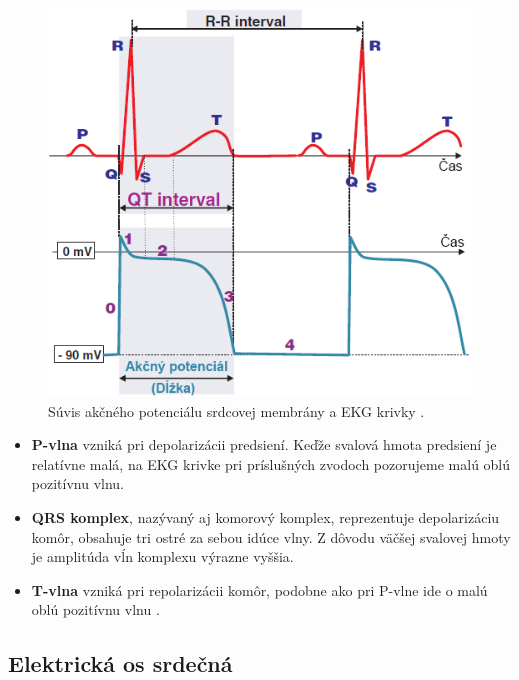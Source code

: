 \begin{figure}[H]
    \centering
    \includegraphics[scale=0.45]{img/action-potential-duration.png}
    \caption{Súvis akčného potenciálu srdcovej membrány a EKG krivky \cite{Blahút_2017}.}
    \label{fig:action_potential_duration}
\end{figure}

\begin{itemize}
    \item \textbf{P-vlna} vzniká pri depolarizácii predsiení. Keďže svalová hmota predsiení je relatívne malá, na EKG krivke pri príslušných zvodoch pozorujeme malú oblú pozitívnu vlnu.
    \item \textbf{QRS komplex}, nazývaný aj komorový komplex, reprezentuje depolarizáciu komôr, obsahuje tri ostré za sebou idúce vlny. Z dôvodu väčšej svalovej hmoty je amplitúda vĺn komplexu výrazne vyššia. 
    \item \textbf{T-vlna} vzniká pri repolarizácii komôr, podobne ako pri P-vlne ide o malú oblú pozitívnu vlnu \cite{Foster_2007}\cite{Bada2010}.
\end{itemize}

\subsection{Elektrická os srdečná}

